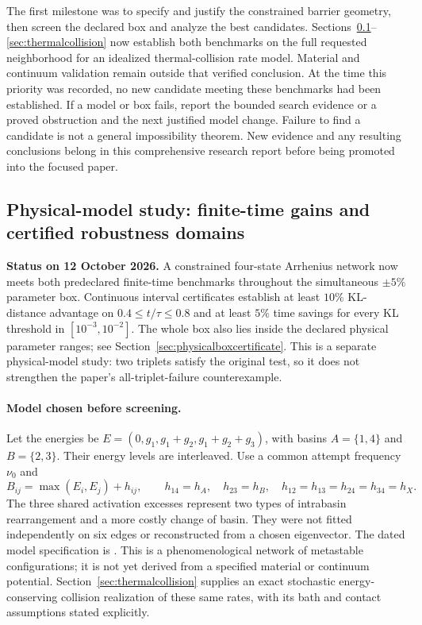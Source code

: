 \documentclass[11pt]{article}
\begin{document}
The first milestone was to specify and justify the constrained barrier
geometry, then screen the declared box and analyze the best candidates.
Sections~\ref{sec:physicalresults}--\ref{sec:thermalcollision} now establish
both benchmarks on the full requested neighborhood for an idealized
thermal-collision rate model. Material and continuum validation remain
outside that verified conclusion.
At the time this priority was recorded, no new candidate meeting these
benchmarks had been established. If a model or box fails, report the
bounded search evidence or a proved obstruction and the next justified
model change. Failure to find a candidate is not a general impossibility
theorem. New evidence and any resulting conclusions belong in this
comprehensive research report before being promoted into the focused paper.


\subsection{Physical-model study: finite-time gains and certified robustness domains}
\label{sec:physicalresults}
\textbf{Status on 12 October 2026.}
A constrained four-state Arrhenius network now meets both predeclared
finite-time benchmarks throughout the simultaneous $\pm5\%$ parameter
box. Continuous interval certificates establish at least $10\%$
KL-distance advantage on $0.4\leq t/\tau\leq0.8$ and at least $5\%$
time savings for every KL threshold in $[10^{-3},10^{-2}]$.
The whole box also lies inside the declared physical parameter ranges;
see Section~\ref{sec:physicalboxcertificate}. This is a separate
physical-model study: two triplets satisfy the original test, so it does
not strengthen the paper's all-triplet-failure counterexample.

\paragraph{Model chosen before screening.}
Let the energies be $E=(0,g_1,g_1+g_2,g_1+g_2+g_3)$, with basins
$A=\{1,4\}$ and $B=\{2,3\}$. Their energy levels are interleaved.
Use a common attempt frequency $\nu_0$ and
\[
 B_{ij}=\max(E_i,E_j)+h_{ij},\qquad
 h_{14}=h_A,\quad h_{23}=h_B,\quad
 h_{12}=h_{13}=h_{24}=h_{34}=h_X.
\]
The three shared activation excesses represent two types of intrabasin
rearrangement and a more costly change of basin. They were not fitted
independently on six edges or reconstructed from a chosen eigenvector.
The dated model specification is .
This is a phenomenological network of metastable configurations; it is
not yet derived from a specified material or continuum potential.
Section~\ref{sec:thermalcollision} supplies an exact stochastic
energy-conserving collision realization of these same rates, with its
bath and contact assumptions stated explicitly.
\end{document}
